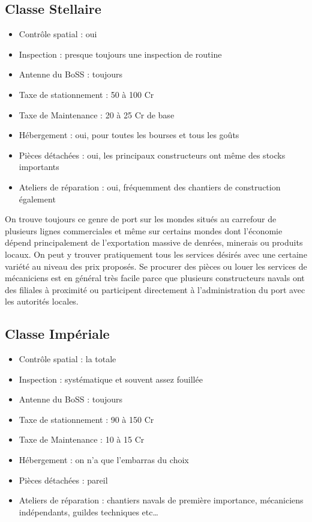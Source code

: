\documentclass{article}
\begin{document}
\subsection*{Classe Stellaire}
\begin{itemize}
	\item Contrôle spatial : oui
	\item Inspection : presque toujours une inspection de routine
	\item Antenne du BoSS : toujours
	\item Taxe de stationnement : 50 à 100 Cr
	\item Taxe de Maintenance : 20 à 25 Cr de base
	\item Hébergement : oui, pour toutes les bourses et tous les goûts
	\item Pièces détachées : oui, les principaux constructeurs ont même des stocks importants
	\item Ateliers de réparation : oui, fréquemment des chantiers de construction également \\
\end{itemize}

On trouve toujours ce genre de port sur les mondes situés au carrefour de plusieurs lignes commerciales et même sur certains mondes dont l'économie dépend principalement de l'exportation massive de denrées, minerais ou produits locaux. On peut y trouver pratiquement tous les services désirés avec une certaine variété au niveau des prix proposés. Se procurer des pièces ou louer les services de mécaniciens est en général très facile parce que plusieurs constructeurs navals ont des filiales à proximité ou participent directement à l'administration du port avec les autorités locales.

\subsection*{Classe Impériale}
\begin{itemize}
	\item Contrôle spatial : la totale
	\item Inspection : systématique et souvent assez fouillée
	\item Antenne du BoSS : toujours
	\item Taxe de stationnement : 90 à 150 Cr
	\item Taxe de Maintenance : 10 à 15 Cr
	\item Hébergement : on n'a que l'embarras du choix
	\item Pièces détachées : pareil
	\item Ateliers de réparation : chantiers navals de première importance, mécaniciens indépendants, guildes techniques etc\ldots \\
\end{itemize}
\end{document}
